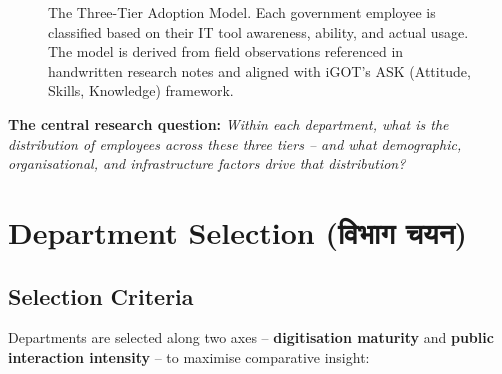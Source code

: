 \documentclass[12pt,a4paper]{article}
\newcommand{\hindi}[1]{{\hindifont #1}}
\begin{document}
\begin{figure}[H]
\caption{The Three-Tier Adoption Model. Each government employee is classified based on their IT tool awareness, ability, and actual usage. The model is derived from field observations referenced in handwritten research notes and aligned with iGOT's ASK (Attitude, Skills, Knowledge) framework.}
\label{fig:three_tier}
\end{figure}

\textbf{The central research question:} \textit{Within each department, what is the distribution of employees across these three tiers -- and what demographic, organisational, and infrastructure factors drive that distribution?}

\section{Department Selection (\hindi{विभाग चयन})}

\subsection{Selection Criteria}

Departments are selected along two axes -- \textbf{digitisation maturity} and \textbf{public interaction intensity} -- to maximise comparative insight:
\end{document}
